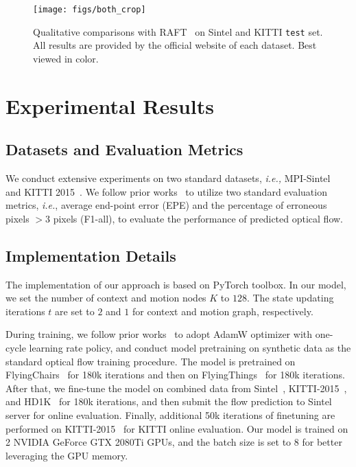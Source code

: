\documentclass[letterpaper]{article} %
\begin{document}
\begin{figure}[ht]
\begin{center}
\texttt{[image: figs/both\_crop]}
\end{center}
\caption{Qualitative comparisons with RAFT~\cite{Teed2020RAFTRA} on Sintel and KITTI {\tt test} set. All results are provided by the official website of each dataset. Best viewed in color.}
\label{fig:both}
\end{figure}


\section{Experimental Results}

\subsection{Datasets and Evaluation Metrics}

We conduct extensive experiments on two standard datasets, {\em i.e.,} MPI-Sintel~\cite{Butler2012} and KITTI 2015~\cite{KITTI_2015}. We follow prior works~\cite{Teed2020RAFTRA, Jiang2021LearningOF} to utilize two standard evaluation metrics, {\em i.e.}, average end-point error (EPE) and the percentage of erroneous pixels $> 3$ pixels (F1-all), to evaluate the performance of predicted optical flow.

\subsection{Implementation Details}

The implementation of our approach is based on PyTorch toolbox. In our model, we set the number of context and motion nodes $K$ to $128$. The state updating iterations $t$ are set to $2$ and $1$ for context and motion graph, respectively.

During training, we follow prior works~\cite{Teed2020RAFTRA, Jiang2021LearningTE} to adopt AdamW optimizer with one-cycle learning rate policy, and conduct model pretraining on synthetic data as the standard optical flow training procedure. The model is pretrained on FlyingChairs~\cite{Dosovitskiy2015FlowNetLO} for 180k iterations and then on FlyingThings~\cite{Mayer2016ALD} for 180k iterations. After that, we fine-tune the model on combined data from Sintel~\cite{Butler2012}, KITTI-2015~\cite{KITTI_2015}, and HD1K~\cite{Kondermann2016TheHB} for 180k iterations, and then submit the flow prediction to Sintel server for online evaluation. Finally, additional 50k iterations of finetuning are performed on KITTI-2015~\cite{KITTI_2015} for KITTI online evaluation. Our model is trained on 2 NVIDIA GeForce GTX 2080Ti GPUs, and the batch size is set to $8$ for better leveraging the GPU memory.
\end{document}
